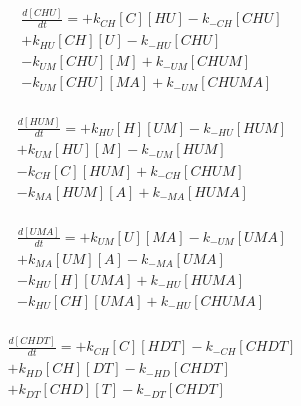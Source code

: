 \begin{equation}
\begin{split}
\frac{d[CHU]}{dt} =   + k_{CH}[C][HU]   - k_{-CH}[CHU]    \\%
                      + k_{HU}[CH][U]   - k_{-HU}[CHU]    \\%
                      - k_{UM}[CHU][M]  + k_{-UM}[CHUM]   \\%
                      - k_{UM}[CHU][MA] + k_{-UM}[CHUMA]  \\%
\end{split}
\end{equation}

\begin{equation}
\begin{split}
\frac{d[HUM]}{dt} =   + k_{HU}[H][UM]  - k_{-HU}[HUM]     \\%
                      + k_{UM}[HU][M]  - k_{-UM}[HUM]     \\%
                      - k_{CH}[C][HUM] + k_{-CH}[CHUM]    \\%
                      - k_{MA}[HUM][A] + k_{-MA}[HUMA]    \\%
\end{split}
\end{equation}

\begin{equation}
\begin{split}
\frac{d[UMA]}{dt} =   + k_{UM}[U][MA]   - k_{-UM}[UMA]    \\%
                      + k_{MA}[UM][A]   - k_{-MA}[UMA]    \\%
                      - k_{HU}[H][UMA]  + k_{-HU}[HUMA]   \\%
                      - k_{HU}[CH][UMA] + k_{-HU}[CHUMA]  \\%
\end{split}
\end{equation}

\begin{equation}
\begin{split}
\frac{d[CHDT]}{dt} =  + k_{CH}[C][HDT] - k_{-CH}[CHDT]    \\%
                      + k_{HD}[CH][DT] - k_{-HD}[CHDT]    \\%
                      + k_{DT}[CHD][T] - k_{-DT}[CHDT]    \\%
\end{split}
\end{equation}

